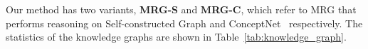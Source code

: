 \documentclass[letterpaper]{article} %
\begin{document}
    


Our method has two variants, \textbf{MRG-S} and \textbf{MRG-C}, which refer to MRG that performs reasoning on  Self-constructed Graph and ConceptNet~\cite{liu-singh:concept_net} respectively.
The statistics of the knowledge graphs are shown in Table~\ref{tab:knowledge_graph}.
\end{document}
